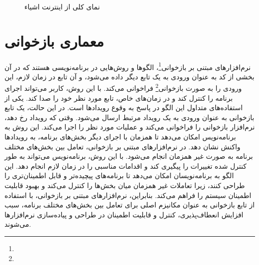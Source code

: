 {\begin{figure}[H]
        \caption{نمای کلی از اینترنت اشیاء}
        \label{fig:iot}
    \end{figure}
}

\section{معماری بازخوانی}
\label{sec:callback}
\paragraph{}
{
    نرم‌افزارهای مبتنی بر بازخوانی\footnote{}، الگوها و روش‌هایی در برنامه‌نویسی هستند که در آن بخشی از کد به عنوان ورودی به یک تابع دیگر داده می‌شود، و آن تابع در زمان لازم، این ورودی را به صورت بازخوانی\footnote{} فراخوانی می‌کند. با این روش، کاربر می‌تواند اجرای برنامه را کنترل کند و در زمان‌های خاص، تابع مورد نظر خود را صدا کند.
    یکی از استفاده‌های متداول این الگو در پاسخ به وقوع رویدادها است. در این حالت، یک تابع بازخوانی به عنوان ورودی به یک رویداد مرتبط ارسال می‌شود. وقتی که رویداد رخ دهد، نرم‌افزار بازخوانی را فراخوانی می‌کند و عملیات مورد نظر را اجرا می‌کند. این روش به برنامه‌نویس امکان می‌دهد تا همزمان با اجرای دیگر بخش‌های برنامه، به رویدادها واکنش نشان دهد.
    در نرم‌افزارهای مبتنی بر بازخوانی، تعامل بین بخش‌های مختلف برنامه به صورت غیر همزمان انجام می‌شود. با این روش، برنامه‌نویس می‌تواند به طور کنترل شده تغییرات را پیگیری کند و اقدامات مناسبی را در زمان لازم انجام دهد. این الگو به برنامه‌نویسان امکان می‌دهد تا برنامه‌های پیچیده‌تر و قابل اطمینان‌تری را طراحی کنند، زیرا تعاملات غیر همزمان میان بخش‌ها را کنترل می‌کند و بهبود قابلیت اطمینان سیستم را فراهم می‌کند.
    بنابراین، نرم‌افزارهای مبتنی بر بازخوانی، با استفاده از تابع بازخوانی به عنوان مکانیزم اصلی برای تعامل بین بخش‌های مختلف برنامه، سبب افزایش انعطاف‌پذیری، کنترل و قابلیت اطمینان در طراحی و پیاده‌سازی نرم‌افزارها می‌شوند.
}